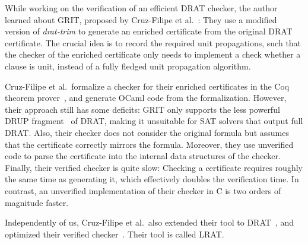 \documentclass[smallcondensed]{svjour3}     %
\begin{document}
While working on the verification of an efficient DRAT checker, the author learned about GRIT, proposed by Cruz-Filipe et al.\ \cite{CMS17}: 
They use a modified version of {\sl drat-trim} to generate an enriched certificate from the original DRAT certificate. 
The crucial idea is to record the required unit propagations, such that the checker of the enriched certificate only needs 
to implement a check whether a clause is unit, instead of a fully fledged unit propagation algorithm.

Cruz-Filipe et al.\ formalize a checker for their enriched certificates in the Coq theorem prover~\cite{BeCa10}, and generate OCaml code from the formalization. 
However, their approach still has some deficits:
GRIT only supports the less powerful DRUP fragment~\cite{WHH13} of DRAT, making it unsuitable for SAT solvers that output full DRAT.
Also, their checker does not consider the original formula but assumes that the certificate correctly mirrors the formula. 
Moreover, they use unverified code to parse the certificate into the internal data structures of the checker.
Finally, their verified checker is quite slow: Checking a certificate requires roughly the same time as generating it, which effectively doubles the verification time.
In contrast, an unverified implementation of their checker in C is two orders of magnitude faster.

Independently of us, Cruz-Filipe et al.~also extended their tool to DRAT~\cite{CHHKS17}, and optimized their verified checker~\cite{HHKW17}. Their tool is called LRAT.


% 
% 
\end{document}
